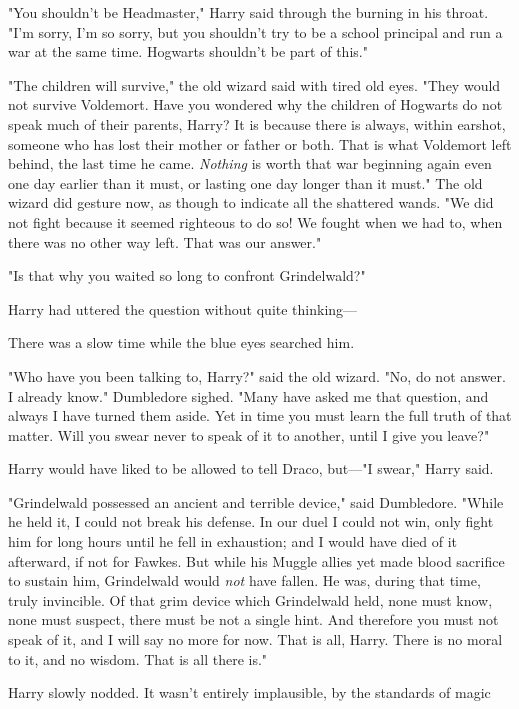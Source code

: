 "You shouldn't be Headmaster," Harry said through the burning in his throat.
"I'm sorry, I'm so sorry, but you shouldn't try to be a school principal and
run a war at the same time. Hogwarts shouldn't be part of this."

"The children will survive," the old wizard said with tired old eyes. "They
would not survive Voldemort. Have you wondered why the children of Hogwarts do
not speak much of their parents, Harry? It is because there is always, within
earshot, someone who has lost their mother or father or both. That is what
Voldemort left behind, the last time he came. \emph{Nothing} is worth that war
beginning again even one day earlier than it must, or lasting one day longer
than it must." The old wizard did gesture now, as though to indicate all the
shattered wands. "We did not fight because it seemed righteous to do so! We
fought when we had to, when there was no other way left. That was our answer."

"Is that why you waited so long to confront Grindelwald?"

Harry had uttered the question without quite thinking---

There was a slow time while the blue eyes searched him.

"Who have you been talking to, Harry?" said the old wizard. "No, do not answer.
I already know." Dumbledore sighed. "Many have asked me that question, and
always I have turned them aside. Yet in time you must learn the full truth of
that matter. Will you swear never to speak of it to another, until I give you
leave?"

Harry would have liked to be allowed to tell Draco, but---"I swear," Harry said.

"Grindelwald possessed an ancient and terrible device," said Dumbledore. "While
he held it, I could not break his defense. In our duel I could not win, only
fight him for long hours until he fell in exhaustion; and I would have died of
it afterward, if not for Fawkes. But while his Muggle allies yet made blood
sacrifice to sustain him, Grindelwald would \emph{not} have fallen. He was,
during that time, truly invincible. Of that grim device which Grindelwald held,
none must know, none must suspect, there must be not a single hint. And
therefore you must not speak of it, and I will say no more for now. That is
all, Harry. There is no moral to it, and no wisdom. That is all there is."

Harry slowly nodded. It wasn't entirely implausible, by the standards of
magic{\el}

